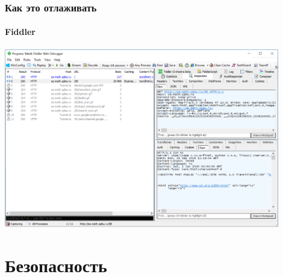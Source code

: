 \documentclass{../../slides-style}
\begin{document}
    \begin{frame}
        \frametitle{Как это отлаживать}
        \framesubtitle{Fiddler}
        \begin{center}
            \includegraphics[width=0.9\textwidth]{fiddler.png}
        \end{center}
    \end{frame}

    \section{Безопасность}

\end{document}
